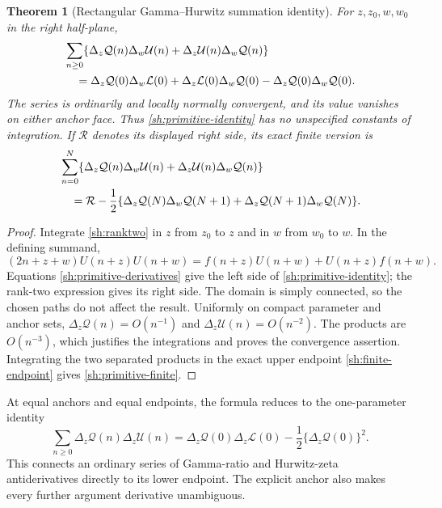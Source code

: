 \documentclass[11pt,letterpaper]{article}
\numberwithin{equation}{section}
\newtheorem{theorem}{Theorem}[section]
\theoremstyle{definition}
\theoremstyle{remark}
\begin{document}
\begin{theorem}[Rectangular Gamma--Hurwitz summation identity]
\label{sh:primitive-theorem}
For $z,z_0,w,w_0$ in the right half-plane,
\begin{align}\label{sh:primitive-identity}
 &\sum_{n\ge0}\{\Delta_z\mathcal Q(n)\Delta_w\mathcal U(n)
                 +\Delta_z\mathcal U(n)\Delta_w\mathcal Q(n)\}\notag\\
 &\quad=\Delta_z\mathcal Q(0)\Delta_w\mathcal L(0)
       +\Delta_z\mathcal L(0)\Delta_w\mathcal Q(0)
       -\Delta_z\mathcal Q(0)\Delta_w\mathcal Q(0).
\end{align}
The series is ordinarily and locally normally convergent, and its
value vanishes on either anchor face. Thus \eqref{sh:primitive-identity}
has no unspecified constants of integration.
If $\mathcal R$ denotes its displayed right side, its exact finite
version is
\begin{align}\label{sh:primitive-finite}
 &\sum_{n=0}^{N}\{\Delta_z\mathcal Q(n)\Delta_w\mathcal U(n)
                 +\Delta_z\mathcal U(n)\Delta_w\mathcal Q(n)\}\notag\\
 &\quad=\mathcal R-\frac12\{\Delta_z\mathcal Q(N)\Delta_w\mathcal Q(N+1)
                       +\Delta_z\mathcal Q(N+1)\Delta_w\mathcal Q(N)\}.
\end{align}
\end{theorem}

\begin{proof}
Integrate \eqref{sh:ranktwo} in $z$ from $z_0$ to $z$ and in $w$
from $w_0$ to $w$. In the defining summand,
\[
 (2n+z+w)U(n+z)U(n+w)
   =f(n+z)U(n+w)+U(n+z)f(n+w).
\]
Equations \eqref{sh:primitive-derivatives} give the left side of
\eqref{sh:primitive-identity}; the rank-two expression gives its
right side. The domain is simply connected, so the chosen paths
do not affect the result. Uniformly on compact parameter and anchor
sets, $\Delta_z\mathcal Q(n)=O(n^{-1})$ and
$\Delta_z\mathcal U(n)=O(n^{-2})$. The products are $O(n^{-3})$,
which justifies the integrations and proves the convergence assertion.
Integrating the two separated products in the exact upper endpoint
\eqref{sh:finite-endpoint} gives \eqref{sh:primitive-finite}.
\end{proof}

At equal anchors and equal endpoints, the formula reduces to the
one-parameter identity
\[
 \sum_{n\ge0}\Delta_z\mathcal Q(n)\Delta_z\mathcal U(n)
       =\Delta_z\mathcal Q(0)\Delta_z\mathcal L(0)
                            -\frac12\{\Delta_z\mathcal Q(0)\}^2.
\]
This connects an ordinary series of Gamma-ratio and Hurwitz-zeta
antiderivatives directly to its lower endpoint. The explicit anchor
also makes every further argument derivative unambiguous.
\end{document}
